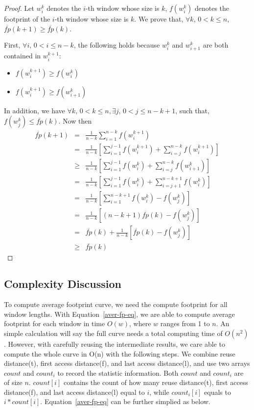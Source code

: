 \begin{proof}
  Let $w_i^k$ denotes the $i$-th window whose size is $k$, $f(w_i^k)$
  denotes the footprint of the $i$-th window whose size is $k$.  We
  prove that, $\forall k$, $0<k \le n$, $\overline{fp}(k+1) \ge
  \overline{fp}(k)$.

First, $\forall i$, $0<i \le n-k$, the following holds because
$w_i^{k}$ and $w_{i+1}^{k}$ are both contained in $w_i^{k+1}$:

\begin{itemize}
\item $f(w_i^{k+1}) \ge f(w_i^{k})$ 
\item $f(w_i^{k+1}) \ge f(w_{i+1}^{k})$ 
\end{itemize}

\noindent In addition, we have $\forall k$,  $0<k\le n, \exists j$, $0<j \le
n-k+1$, such that, $f(w_j^k) \le \overline{fp}(k)$.  Now then
\begin{eqnarray}
\label{eq9}
\overline{fp}(k+1) &=&\frac{1}{n-k}\sum_{i=1}^{n-k}f(w_i^{k+1}) \nonumber \\
&=&\frac{1}{n-k}[\sum_{i=1}^{j-1}f(w_i^{k+1})+\sum_{i=j}^{n-k}f(w_i^{k+1})] \nonumber \\
&\ge&\frac{1}{n-k}[\sum_{i=1}^{j-1}f(w_i^{k})+\sum_{i=j}^{n-k}f(w_{i+1}^{k})] \nonumber \\
&=&\frac{1}{n-k}[\sum_{i=1}^{j-1}f(w_i^{k})+\sum_{i=j+1}^{n-k+1}f(w_{i}^{k})] \nonumber \\
&=&\frac{1}{n-k}[\sum_{i=1}^{n-k+1}f(w_i^{k})-f(w_j^k)] \nonumber \\
&=&\frac{1}{n-k}[(n-k+1)\overline{fp}(k)-f(w_j^k)] \nonumber \\
&=&\overline{fp}(k)+\frac{1}{n-k}[\overline{fp}(k)-f(w_j^k)] \nonumber \\
&\ge&\overline{fp}(k) \nonumber
\end{eqnarray}
\end{proof}


\subsection{Complexity Discussion}

To compute average footprint curve, we need the compute footprint for
all window lengths. With Equation~\ref{aver-fp-eq}, we are able to
compute average footprint for each window in time $O(w)$, where $w$
ranges from 1 to $n$. An simple calculation will say the full curve
needs a total computing time of $O(n^2)$. However, with carefully
reusing the intermediate results, we care able to compute the whole
curve in O(n) with the following steps. We combine reuse distance(t), first
access distance(f), and last access distance(l), and use two arrays
$count$ and $count_i$ to record the statistic information. Both
$count$ and $count_i$ are of size $n$. $count[i]$ contains the count
of how many reuse distance(t), first access distance(f), and last
access distance(l) equal to $i$, while $count_i[i]$ equals to
$i*count[i]$. Equation~\ref{aver-fp-eq} can be further simplied as
below. 

